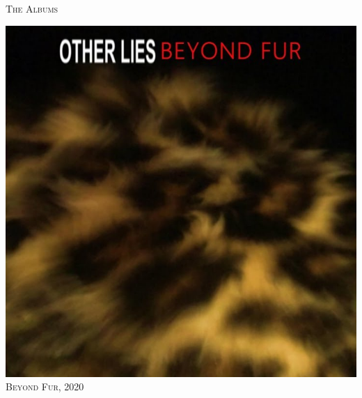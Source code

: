 \begin{titlepage}
  \newpage
  \pagecolor{black}
  \color{white}

  \begin{center}
    {\Huge \sffamily \scshape The Albums}\\
  \end{center}

  \vspace{5em}

  \begin{minipage}[t]{.33\textwidth}
    \centering
    \includegraphics[width=0.98\linewidth]{1-Beyond-Fur/beyond-fur.jpg}\\
    \vspace{2em}
    {\Large \scshape Beyond Fur, 2020}
  \end{minipage}%
  \begin{minipage}[t]{0.33\textwidth}
    \centering

\end{minipage}
\end{titlepage}
